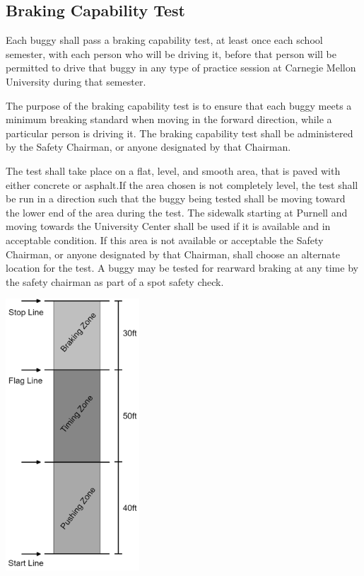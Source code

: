 \subsection{Braking Capability Test}

	Each buggy shall pass a braking capability test, at least once each school semester, with each person who will be driving it, before that person will be permitted to drive that buggy in any type of practice session at
	Carnegie Mellon University during that semester. 
	
	The purpose of the braking capability test is to ensure that each buggy meets a minimum breaking standard when moving in the forward direction, while a particular person is driving it.  The braking capability test shall be administered by the Safety Chairman, or anyone designated by that Chairman.

	The test shall take place on a flat, level, and smooth area, that is paved with either concrete or asphalt.If the area chosen is not completely level, the test shall be run in a direction such that the buggy being tested shall be moving toward the lower end of the area during the test. The sidewalk starting at Purnell and moving towards the University Center shall be used if it is available and in acceptable condition. If this area is not available or acceptable the Safety Chairman, or anyone designated by that Chairman, shall choose an alternate location for the test. A buggy may be tested for rearward braking at any time by the safety chairman as part of a spot safety check.


	\begin{center}
		\includegraphics[height=4in]{assets/Buggy-Brake-Test-gs.png}
	\end{center}
	
